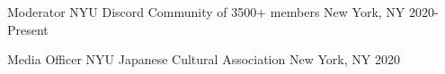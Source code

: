 



\begin{cvhonors}

  \cvhonor
    {Moderator} %
    {NYU Discord Community of 3500+ members} %
    {New York, NY} %
    {2020-Present} %
    
  \cvhonor
    {Media Officer} %
    {NYU Japanese Cultural Association} %
    {New York, NY} %
    {2020} %

\end{cvhonors}


